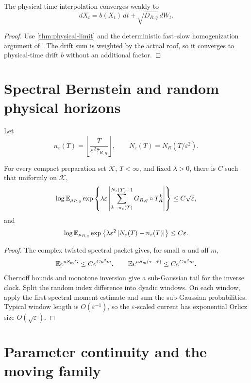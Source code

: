 \begin{corollary}\label{cor:sde}
The physical-time interpolation converges weakly to
\[
 dX_t=b(X_t)\,dt+\sqrt{D_{R,q}}\,dW_t.
\]
\end{corollary}
\begin{proof}
Use \cref{thm:physical-limit} and the deterministic fast--slow homogenization
argument of \cite{KellyMelbourne2017}.  The drift sum is weighted by the actual
roof, so it converges to physical-time drift $b$ without an additional factor.
\end{proof}

\section{Spectral Bernstein and random physical horizons}\label{sec:window}
Let
\[
 n_\varepsilon(T)=\left\lfloor
 \frac{T}{\varepsilon^2\bar\tau_{R,q}}\right\rfloor,
 \qquad
 N_\varepsilon(T)=N_R(T/\varepsilon^2).
\]

\begin{theorem}\label{thm:window}
For every compact preparation set $\mathcal K$, $T<\infty$, and fixed
$\lambda>0$, there is $C$ such that uniformly on $\mathcal K$,
\[
 \log\mathbb E_{\mu_{R,q}}
 \exp\left\{
 \lambda\varepsilon
 \left|\sum_{k=n_\varepsilon(T)}^{N_\varepsilon(T)-1}
 G_{R,q}\circ T_R^k\right|
 \right\}
 \le C\sqrt\varepsilon,
\]
and
\[
 \log\mathbb E_{\mu_{R,q}}
 \exp\left\{
 \lambda\varepsilon^2
 \left\lvert N_\varepsilon(T)-n_\varepsilon(T)\right\rvert
 \right\}
 \le C\varepsilon.
\]
\end{theorem}
\begin{proof}
The complex twisted spectral packet gives, for small $u$ and all $m$,
\[
 \mathbb E e^{uS_mG}\le Ce^{Cu^2m},
 \qquad
 \mathbb E e^{uS_m(\tau-\bar\tau)}\le Ce^{Cu^2m}.
\]
Chernoff bounds and monotone inversion give a sub-Gaussian tail for the inverse
clock.  Split the random index difference into dyadic windows.  On each
window, apply the first spectral moment estimate and sum the sub-Gaussian
probabilities.  Typical window length is $O(\varepsilon^{-1})$, so the
$\varepsilon$-scaled current has exponential Orlicz size
$O(\sqrt\varepsilon)$.
\end{proof}

\section{Parameter continuity and the moving family}\label{sec:parameter}
